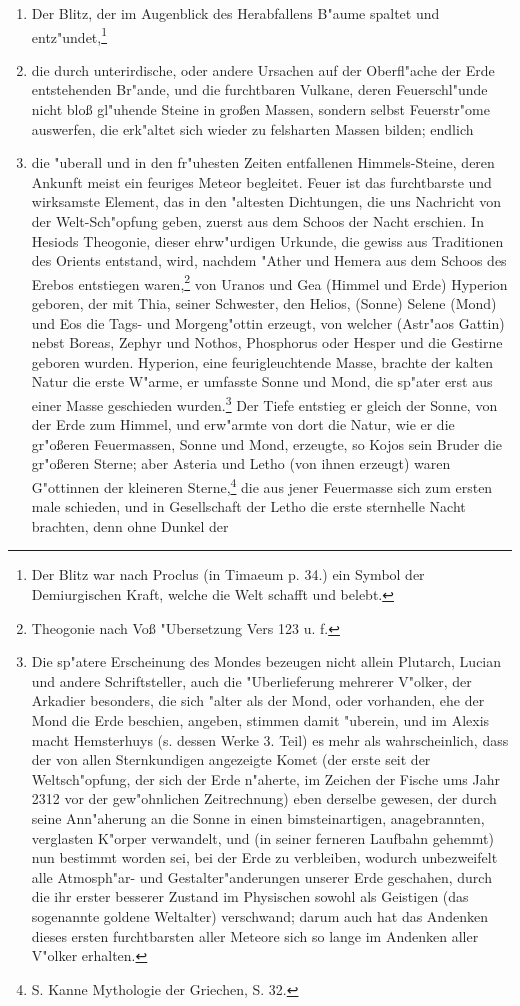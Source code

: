 \documentclass[a4paper, 11pt, oneside, polutonikogreek, german]{article}
\begin{document}
\begin{enumerate}
    \item Der Blitz, der im Augenblick des Herabfallens B"aume spaltet und entz"undet,\footnote{Der Blitz war nach Proclus (in Timaeum p. 34.) ein Symbol der Demiurgischen Kraft, welche die Welt schafft und belebt.}
    \item die durch unterirdische, oder andere Ursachen auf der Oberfl"ache der Erde entstehenden Br"ande, und die furchtbaren Vulkane, deren Feuerschl"unde nicht bloß gl"uhende Steine in großen Massen, sondern selbst Feuerstr"ome auswerfen, die erk"altet sich wieder zu felsharten Massen bilden; endlich
    \item die "uberall und in den fr"uhesten Zeiten entfallenen Himmels-Steine, deren Ankunft meist ein feuriges Meteor begleitet. Feuer ist das furchtbarste und wirksamste Element, das in den "altesten Dichtungen, die uns Nachricht von der Welt-Sch"opfung geben, zuerst aus dem Schoos der Nacht erschien. In Hesiods Theogonie, dieser ehrw"urdigen Urkunde, die gewiss aus Traditionen des Orients entstand, wird, nachdem "Ather und Hemera aus dem Schoos des Erebos entstiegen waren,\footnote{Theogonie nach Voß "Ubersetzung Vers 123 u. f.} von Uranos und Gea (Himmel und Erde) Hyperion geboren, der mit Thia, seiner Schwester, den Helios, (Sonne) Selene (Mond) und Eos die Tags- und Morgeng"ottin erzeugt, von welcher (Astr"aos Gattin) nebst Boreas, Zephyr und Nothos, Phosphorus oder Hesper und die Gestirne geboren wurden. Hyperion, eine feurigleuchtende Masse, brachte der kalten Natur die erste W"arme, er umfasste Sonne und Mond, die sp"ater erst aus einer Masse geschieden wurden.\footnote{Die sp"atere Erscheinung des Mondes bezeugen nicht allein Plutarch, Lucian und andere Schriftsteller, auch die "Uberlieferung mehrerer V"olker, der Arkadier besonders, die sich "alter als der Mond, oder vorhanden, ehe der Mond die Erde beschien, angeben, stimmen damit "uberein, und im Alexis macht Hemsterhuys (s. dessen Werke 3. Teil) es mehr als wahrscheinlich, dass der von allen Sternkundigen angezeigte Komet (der erste seit der Weltsch"opfung, der sich der Erde n"aherte, im Zeichen der Fische ums Jahr 2312 vor der gew"ohnlichen Zeitrechnung) eben derselbe gewesen, der durch seine Ann"aherung an die Sonne in einen bimsteinartigen, anagebrannten, verglasten K"orper verwandelt, und (in seiner ferneren Laufbahn gehemmt) nun bestimmt worden sei, bei der Erde zu verbleiben, wodurch unbezweifelt alle Atmosph"ar- und Gestalter"anderungen unserer Erde geschahen, durch die ihr erster besserer Zustand im Physischen sowohl als Geistigen (das sogenannte goldene Weltalter) verschwand; darum auch hat das Andenken dieses ersten furchtbarsten aller Meteore sich so lange im Andenken aller V"olker erhalten.} Der Tiefe entstieg er gleich der Sonne, von der Erde zum Himmel, und erw"armte von dort die Natur, wie er die gr"oßeren Feuermassen, Sonne und Mond, erzeugte, so Kojos sein Bruder die gr"oßeren Sterne; aber Asteria und Letho (von ihnen erzeugt) waren G"ottinnen der kleineren Sterne,\footnote{S. Kanne Mythologie der Griechen, S. 32.} die aus jener Feuermasse sich zum ersten male schieden, und in Gesellschaft der Letho die erste sternhelle Nacht brachten, denn ohne Dunkel der 
\end{enumerate}
\end{document}

